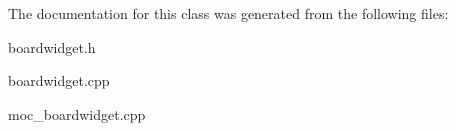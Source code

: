 

The documentation for this class was generated from the following files:\begin{DoxyCompactItemize}
\item 
boardwidget.h\item 
boardwidget.cpp\item 
moc\_\-boardwidget.cpp\end{DoxyCompactItemize}
